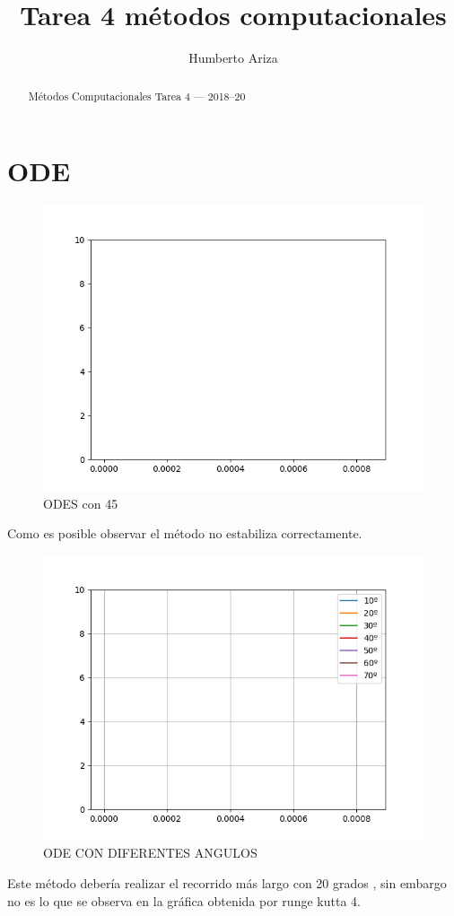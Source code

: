 \documentclass[12pt]{article}
\title{Tarea 4 métodos computacionales}
\author{Humberto Ariza}
\begin{document}
\maketitle


\begin{abstract}
    Métodos Computacionales
    Tarea 4 — 2018–20
\end{abstract}

\section{ODE}



\begin{figure}[h!]
\includegraphics[scale=0.5]{ODES45.png}
\caption{ODES con 45}
\end{figure}

Como es posible observar el método no estabiliza correctamente. 

\begin{figure}[h!]
\includegraphics[scale=0.5]{ODESANGULOS.png}
\caption{ODE CON DIFERENTES ANGULOS}
\end{figure}
Este método debería realizar el recorrido más largo con 20 grados , sin embargo no es lo que se observa en la gráfica obtenida por runge kutta 4.
\end{document}
